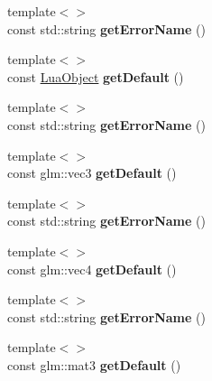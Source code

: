 \begin{DoxyCompactItemize}
\mbox{\label{classTarbora_1_1LuaType_a93dc235d28f8a9bc98b5aa3abc18f7d6}} 
{\footnotesize template$<$$>$ }\\const std\+::string {\bfseries get\+Error\+Name} ()
\item 
\mbox{\label{classTarbora_1_1LuaType_a9cb4312e3c088f9c198afe0431bdf91b}} 
{\footnotesize template$<$$>$ }\\const \hyperlink{classTarbora_1_1LuaObject}{Lua\+Object} {\bfseries get\+Default} ()
\item 
\mbox{\label{classTarbora_1_1LuaType_ab0d36289f699e9c5fd00fc590e63c4b7}} 
{\footnotesize template$<$$>$ }\\const std\+::string {\bfseries get\+Error\+Name} ()
\item 
\mbox{\label{classTarbora_1_1LuaType_a00280d5363e782cbcdec8df80c393b1f}} 
{\footnotesize template$<$$>$ }\\const glm\+::vec3 {\bfseries get\+Default} ()
\item 
\mbox{\label{classTarbora_1_1LuaType_a5101f7840b8ad1e7459de81d53e022bb}} 
{\footnotesize template$<$$>$ }\\const std\+::string {\bfseries get\+Error\+Name} ()
\item 
\mbox{\label{classTarbora_1_1LuaType_a015e9f8383e2d1d9bc18efaae3b17ad1}} 
{\footnotesize template$<$$>$ }\\const glm\+::vec4 {\bfseries get\+Default} ()
\item 
\mbox{\label{classTarbora_1_1LuaType_a36a192d8a6877fcafc37ef734de0057c}} 
{\footnotesize template$<$$>$ }\\const std\+::string {\bfseries get\+Error\+Name} ()
\item 
\mbox{\label{classTarbora_1_1LuaType_a4ac9bd43de4f587f871cbe340b2081ac}} 
{\footnotesize template$<$$>$ }\\const glm\+::mat3 {\bfseries get\+Default} ()
\item 
\mbox{\label{classTarbora_1_1LuaType_a752298ee2bb89fef45a1fba23cfa7f14}} 

\end{DoxyCompactItemize}
